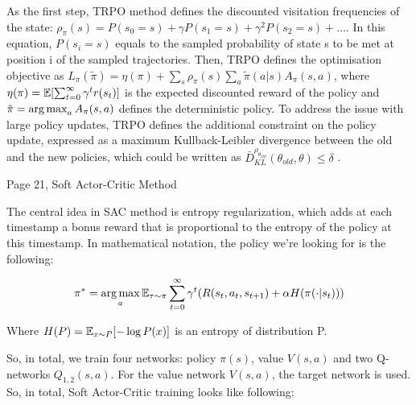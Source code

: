 As the first step, TRPO method defines the discounted visitation frequencies of
the state: \begin{math}\rho_\pi(s)=P(s_0=s)+\gamma P(s_1=s)+\gamma^2 P(s_2=s)+\ldots\end{math}.
In this equation, \begin{math}P(s_i=s)\end{math} equals to the sampled
probability of state s to be met at position i of the sampled trajectories.
Then, TRPO defines the optimisation objective as
\begin{math}L_\pi(\tilde{\pi})=\eta(\pi) +
  \sum_s\rho_\pi(s)\sum_a\tilde{\pi}(a|s)A_\pi(s, a)\end{math},
where \begin{math}\eta(\pi)=\operatorname{\mathbb{E}}[\sum_{t=0}^{\infty}\gamma^t r(s_t)]\end{math} is
the expected discounted reward of the policy and
\begin{math}\tilde{\pi}=\operatorname*{arg\,max}_aA_\pi(s, a)\end{math} defines the deterministic policy.
To address the issue with large policy updates, TRPO defines the additional
constraint on the policy update, expressed as a maximum Kullback-Leibler
divergence between the old and the new policies, which could be written as
\begin{math}\bar{D}_{KL}^{\rho_{\theta_{old}}}(\theta_{old},\theta) \leq \delta\end{math}
.

Page 21, Soft Actor-Critic Method

The central idea in SAC method is entropy regularization, which adds at each timestamp a bonus reward that is proportional to the entropy of the policy at this timestamp. In mathematical notation, the policy we’re looking for is the following:

\begin{equation*}
\pi^* = \operatorname*{arg\,max}\limits_a \operatorname{\mathbb{E}}_{\tau \sim \pi} \sum_{t=0}^{\infty}\gamma^t(R(s_t, a_t, s_{t+1}) + 
\alpha H(\pi(\cdot | s_t)))
\end{equation*}

Where \begin{math}H(P) = \operatorname{\mathbb{E}}_{x \sim P}[-\log P(x)]\end{math} is an entropy of distribution P.

So, in total, we train four networks: policy \begin{math}\pi(s)\end{math}, value 
\begin{math}V(s, a)\end{math} and two Q-networks \begin{math}Q_{1,2}(s,a)\end{math}. 
For the value network \begin{math}V(s, a)\end{math}, the target network is used. So, in total, Soft Actor-Critic training looks like following:

